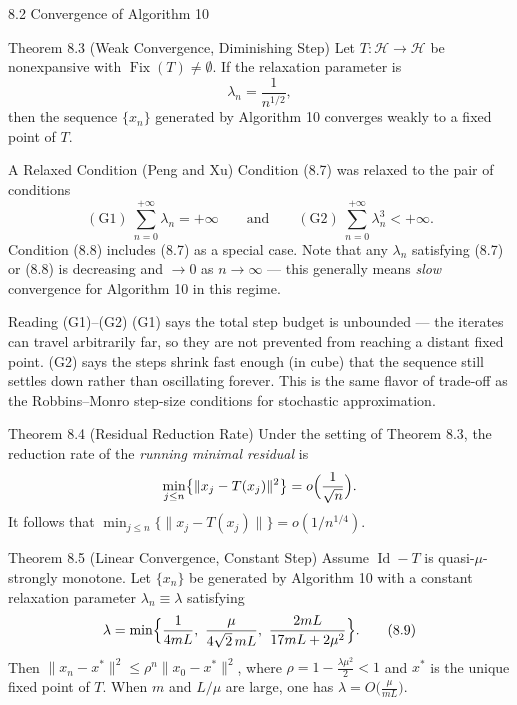 \documentclass[aspectratio=169,10pt]{beamer}
\newcommand{\Hsp}{\mathcal H}
\newcommand{\Fix}{\operatorname{Fix}}
\newcommand{\Id}{\operatorname{Id}}
\newcommand{\norm}[1]{\lVert #1 \rVert}
\begin{document}
\begin{frame}[allowframebreaks]{8.2 Convergence of Algorithm 10}

\begin{block}{Theorem 8.3 (Weak Convergence, Diminishing Step)}
Let $T:\Hsp\to\Hsp$ be nonexpansive with $\Fix(T)\neq\emptyset$. If the relaxation parameter is
\[
  \lambda_n = \frac{1}{n^{1/2}}, \tag{8.7}
\]
then the sequence $\{x_n\}$ generated by Algorithm 10 converges weakly to a fixed point of $T$.
\end{block}

\begin{block}{A Relaxed Condition (Peng and Xu)}
Condition (8.7) was relaxed to the pair of conditions
\[
  (\mathrm{G1})\ \sum_{n=0}^{+\infty}\lambda_n=+\infty \qquad \text{and} \qquad (\mathrm{G2})\ \sum_{n=0}^{+\infty}\lambda_n^3<+\infty. \tag{8.8}
\]
Condition (8.8) includes (8.7) as a special case. Note that any $\lambda_n$ satisfying (8.7) or (8.8) is decreasing and $\to 0$ as $n\to\infty$ --- this generally means \emph{slow} convergence for Algorithm 10 in this regime.
\end{block}

\begin{alertblock}{Reading (G1)--(G2)}
(G1) says the total step budget is unbounded --- the iterates can travel arbitrarily far, so they are not prevented from reaching a distant fixed point. (G2) says the steps shrink fast enough (in cube) that the sequence still settles down rather than oscillating forever. This is the same flavor of trade-off as the Robbins--Monro step-size conditions for stochastic approximation.
\end{alertblock}

\framebreak

\begin{block}{Theorem 8.4 (Residual Reduction Rate)}
Under the setting of Theorem 8.3, the reduction rate of the \emph{running minimal residual} is
\[
  \min_{j\le n}\bigl\{\norm{x_j-T(x_j)}^2\bigr\} = o\Bigl(\frac{1}{\sqrt n}\Bigr).
\]
It follows that $\min_{j\le n}\{\norm{x_j-T(x_j)}\} = o(1/n^{1/4})$.
\end{block}

\begin{block}{Theorem 8.5 (Linear Convergence, Constant Step)}
Assume $\Id-T$ is quasi-$\mu$-strongly monotone. Let $\{x_n\}$ be generated by Algorithm 10 with a constant relaxation parameter $\lambda_n\equiv\lambda$ satisfying
\[
  \lambda = \min\Bigl\{\frac{1}{4mL},\ \frac{\mu}{4\sqrt2\,mL},\ \frac{2mL}{17mL+2\mu^2}\Bigr\}. \tag{8.9}
\]
Then $\norm{x_n-x^*}^2 \le \rho^n\norm{x_0-x^*}^2$, where $\rho = 1-\frac{\lambda\mu^2}{2}<1$ and $x^*$ is the unique fixed point of $T$. When $m$ and $L/\mu$ are large, one has $\lambda = O\bigl(\frac{\mu}{mL}\bigr)$.
\end{block}


\end{frame}
\end{document}
